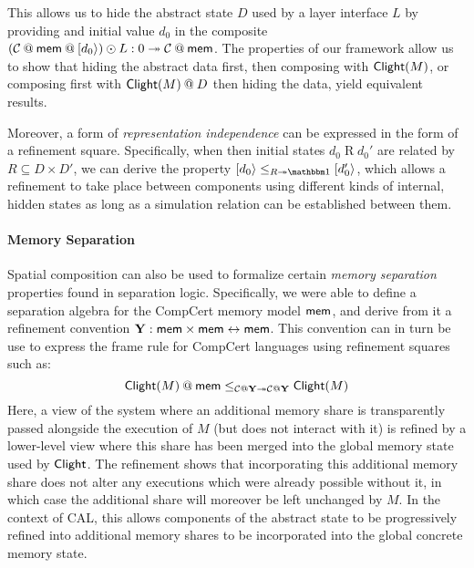 \begin{example}
This allows us to hide the abstract state $D$
used by a layer interface $L$ by providing and initial value $d_0$
in the composite
$
  (\mathcal{C} \mathbin@ \kw{mem} \mathbin@ [d_0\rangle) \odot L :
  \emptysig \twoheadrightarrow \mathcal{C} \mathbin@ \kw{mem}
$.
The properties of our framework allow us to show that
hiding the abstract data first, then composing with $ \mathsf{Clight} (M)$,
or composing first with $\kw{Clight}(M)\mathbin@ D$ then hiding the data,
yield equivalent results.
\end{example}

Moreover, a form of \emph{representation independence}
can be expressed in the form of a refinement square.
Specifically,
when then initial states $d_0 \mathrel{R} d_0'$
are related by $R \subseteq D \times D'$,
we can derive the property
$
  [d_0 \rangle \le_{R \twoheadrightarrow \mathbbm1} [d_0'\rangle
$,
which allows a refinement to take place between components
using different kinds of internal, hidden states
as long as a simulation relation can be established between them.

\vspace*{-2ex}
\paragraph{Memory Separation}

Spatial composition can also be used to formalize
certain \emph{memory separation} properties found in separation logic.
Specifically,
we were able to define a separation algebra for the CompCert memory model $ \mathsf{mem} $,
and derive from it a refinement convention
$\mathbf{Y} :  \mathsf{mem}  \times  \mathsf{mem}  \leftrightarrow  \mathsf{mem} $.
This convention can in turn be use to express the frame rule
for CompCert languages using refinement squares such as:
\[
  \kw{Clight}(M) \mathbin@ \kw{mem} \le_{\mathcal{C} \mathbin@ \mathbf{Y} \twoheadrightarrow
  \mathcal{C} \mathbin@ \mathbf{Y}} \kw{Clight}(M)
\]
Here, a view of the system where an additional memory share
is transparently passed alongside the execution of $M$ (but does not interact with it)
is refined by a lower-level view where this share
has been merged into the global memory state used by $ \mathsf{Clight} $. 
The refinement shows that incorporating this additional memory share
does not alter any executions which were already possible without it,
in which case the additional share will moreover be left unchanged by $M$.
In the context of CAL,
this allows components of the abstract state
to be progressively refined into additional memory shares
to be incorporated into the global concrete memory state.

